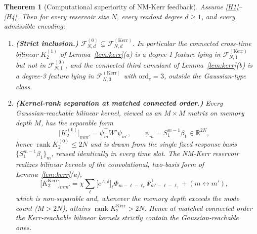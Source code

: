 \documentclass[11pt]{article}
\newtheorem{theorem}{Theorem}
\theoremstyle{remark}
\newcommand{\Fclass}[2]{\mathcal{F}^{(#1)}_{#2}}
\newcommand{\Kerr}{\mathrm{Kerr}}
\newcommand{\ordc}{\mathrm{ord}_c}
\begin{document}
\begin{theorem}[Computational superiority of NM-Kerr feedback]\label{thm:main}
Assume \ref{H1}--\ref{H4}. Then for every reservoir size $N$, every readout
degree $d\ge1$, and every admissible encoding:
\begin{enumerate}[label=(1\alph*)]
\item \textbf{(Strict inclusion.)} $\Fclass{0}{N,d}\subsetneq\Fclass{\Kerr}{N,d}$.
In particular the connected cross-time bilinear $K^{(1)}_2$ of
Lemma~\ref{lem:kerr}(a) is a degree-1 feature lying in $\Fclass{\Kerr}{N,1}$ but
not in $\Fclass{0}{N,1}$, and the connected third cumulant of
Lemma~\ref{lem:kerr}(b) is a degree-3 feature lying in $\Fclass{\Kerr}{N,3}$ with
$\ordc=3$, outside the Gaussian-type class.
\item \textbf{(Kernel-rank separation at matched connected order.)} Every
Gaussian-reachable bilinear kernel, viewed as an $M\times M$ matrix on memory
depth $M$, has the separable form
\[
\big[K^{(0)}_2\big]_{mm'}=\psi_m^\top W'\psi_{m'},\qquad
\psi_m=S_1^{m-1}\beta_1\in\mathbb{R}^{2N},
\]
hence $\operatorname{rank}K^{(0)}_2\le2N$ and is drawn from the single fixed
response basis $\{S_1^{m-1}\beta_1\}_m$, reused identically in every time slot. The
NM-Kerr reservoir realizes bilinear kernels of the convolutional, two-basis form
of Lemma~\ref{lem:kerr}(a),
\[
\big[K^{\Kerr}_2\big]_{mm'}=\chi\sum_\ell\big[e^{A_1\delta}\big]_\ell
\Phi_{m-\ell-\ell_\tau}\Psi^\top_{m'-\ell-\ell_\tau}+(m\leftrightarrow m'),
\]
which is non-separable and, whenever the memory depth exceeds the mode count
($M>2N$), attains $\operatorname{rank}K^{\Kerr}_2>2N$. Hence at matched connected
order the Kerr-reachable bilinear kernels strictly contain the Gaussian-reachable
ones.
\end{enumerate}
\end{theorem}
\end{document}
